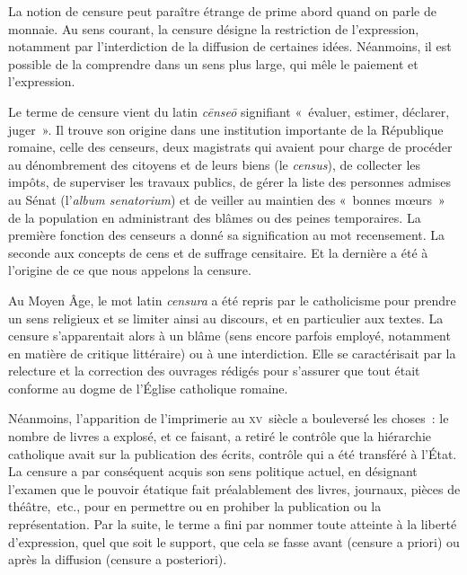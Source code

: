 La notion de censure peut paraître étrange de prime abord quand on parle de monnaie. Au sens courant, la censure désigne la restriction de l'expression, notamment par l'interdiction de la diffusion de certaines idées. Néanmoins, il est possible de la comprendre dans un sens plus large, qui mêle le paiement et l'expression.

Le terme de censure vient du latin \emph{cēnseō} signifiant «~évaluer, estimer, déclarer, juger~». Il trouve son origine dans une institution importante de la République romaine, celle des censeurs, deux magistrats qui avaient pour charge de procéder au dénombrement des citoyens et de leurs biens (le \emph{census}), de collecter les impôts, de superviser les travaux publics, de gérer la liste des personnes admises au Sénat (l'\emph{album senatorium}) et de veiller au maintien des «~bonnes mœurs~» de la population en administrant des blâmes ou des peines temporaires. La première fonction des censeurs a donné sa signification au mot recensement. La seconde aux concepts de cens et de suffrage censitaire. Et la dernière a été à l'origine de ce que nous appelons la censure.

Au Moyen Âge, le mot latin \emph{censura} a été repris par le catholicisme pour prendre un sens religieux et se limiter ainsi au discours, et en particulier aux textes. La censure s'apparentait alors à un blâme (sens encore parfois employé, notamment en matière de critique littéraire) ou à une interdiction. Elle se caractérisait par la relecture et la correction des ouvrages rédigés pour s'assurer que tout était conforme au dogme de l'Église catholique romaine.

Néanmoins, l'apparition de l'imprimerie au \textsc{xv}\ieme{}~siècle a bouleversé les choses~: le nombre de livres a explosé, et ce faisant, a retiré le contrôle que la hiérarchie catholique avait sur la publication des écrits, contrôle qui a été transféré à l'État. La censure a par conséquent acquis son sens politique actuel, en désignant l'examen que le pouvoir étatique fait préalablement des livres, journaux, pièces de théâtre,~etc., pour en permettre ou en prohiber la publication ou la représentation. Par la suite, le terme a fini par nommer toute atteinte à la liberté d'expression, quel que soit le support, que cela se fasse avant (censure a priori) ou après la diffusion (censure a posteriori).

